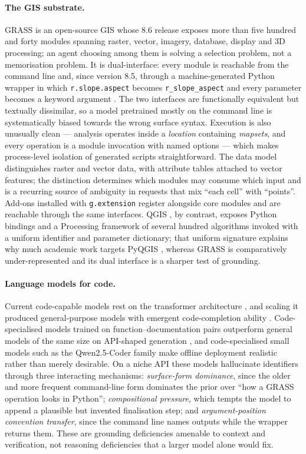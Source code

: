 \paragraph{The GIS substrate.} GRASS \cite{neteler2012grass} is an open-source
GIS whose 8.6 release exposes more than five hundred and forty modules spanning
raster, vector, imagery, database, display and 3D processing; an agent choosing
among them is solving a selection problem, not a memorisation problem. It is
dual-interface: every module is reachable from the command line and, since
version 8.5, through a machine-generated Python wrapper in which
\texttt{r.slope.aspect} becomes \texttt{r\_slope\_aspect} and every parameter
becomes a keyword argument \cite{grass_tools}. The two interfaces are
functionally equivalent but textually dissimilar, so a model pretrained mostly
on the command line is systematically biased towards the wrong surface syntax.
Execution is also unusually clean --- analysis operates inside a
\emph{location} containing \emph{mapsets}, and every operation is a module
invocation with named options --- which makes process-level isolation of
generated scripts straightforward. The data model distinguishes raster and
vector data, with attribute tables attached to vector features; the distinction
determines which modules may consume which input and is a recurring source of
ambiguity in requests that mix ``each cell'' with ``points''. Add-ons installed
with \texttt{g.extension} register alongside core modules and are reachable
through the same interfaces. QGIS \cite{qgissoftware}, by contrast, exposes
Python bindings \cite{pyqgis} and a Processing framework of several hundred
algorithms invoked with a uniform identifier and parameter dictionary; that
uniform signature explains why much academic work targets PyQGIS
\cite{mansourian2024chatgeoai}, whereas GRASS is comparatively
under-represented and its dual interface is a sharper test of grounding.

\paragraph{Language models for code.} Current code-capable models rest on the
transformer architecture \cite{vaswani2017attention}, and scaling it produced
general-purpose models with emergent code-completion ability
\cite{brown2020gpt3}. Code-specialised models trained on function--documentation
pairs outperform general models of the same size on API-shaped generation
\cite{chen2021codex}, and code-specialised small models such as the
Qwen2.5-Coder family \cite{ji2024qwen25coder} make offline deployment realistic
rather than merely desirable. On a niche API these models hallucinate
identifiers \cite{zan2023surveycode,ji2023hallucination} through three
interacting mechanisms: \emph{surface-form dominance}, since the older and more
frequent command-line form dominates the prior over ``how a GRASS operation
looks in Python''; \emph{compositional pressure}, which tempts the model to
append a plausible but invented finalisation step; and \emph{argument-position
convention transfer}, since the command line names outputs while the wrapper
returns them. These are grounding deficiencies amenable to context and
verification, not reasoning deficiencies that a larger model alone would fix.

